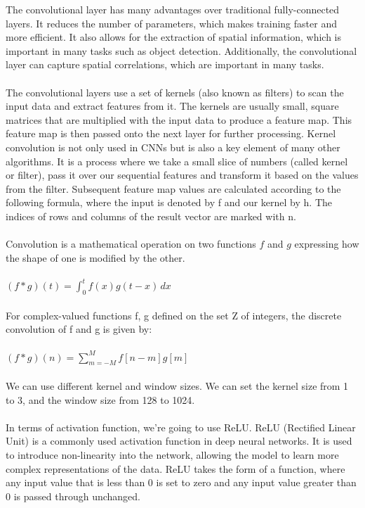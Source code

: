 \documentclass{article}
\begin{document}
The convolutional layer has many advantages over traditional fully-connected layers. It reduces the number of parameters, which makes training faster and more efficient. It also allows for the extraction of spatial information, which is important in many tasks such as object detection. Additionally, the convolutional layer can capture spatial correlations, which are important in many tasks.\\
\\
The convolutional layers use a set of kernels (also known as filters) to scan the input data and extract features from it. The kernels are usually small, square matrices that are multiplied with the input data to produce a feature map. This feature map is then passed onto the next layer for further processing. Kernel convolution is not only used in CNNs but is also a key element of many other algorithms. It is a process where we take a small slice of numbers (called kernel or filter), pass it over our sequential features and transform it based on the values from the filter. Subsequent feature map values are calculated according to the following formula, where the input is denoted by f and our kernel by h. The indices of rows and columns of the result vector are marked with n.\\
\\
Convolution is a mathematical operation on two functions $f$ and $g$ expressing how the shape of one is modified by the other.\\
\\
$(f*g)(t)=\int_{0}^{t} f(x)g(t-x) \,dx$\\
\\
For complex-valued functions f, g defined on the set Z of integers, the discrete convolution of f and g is given by:\\
\\
$(f*g)(n)=\sum_{m=-M}^{M} f[n-m]g[m]$\\
\\
We can use different kernel and window sizes. We can set the kernel size from 1 to 3, and the window size from 128 to 1024.\\
\\
In terms of activation function, we're going to use ReLU. ReLU (Rectified Linear Unit) is a commonly used activation function in deep neural networks. It is used to introduce non-linearity into the network, allowing the model to learn more complex representations of the data. ReLU takes the form of a function, where any input value that is less than 0 is set to zero and any input value greater than 0 is passed through unchanged.\\
\end{document}
